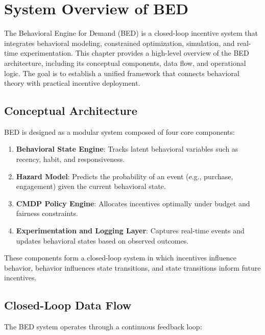 \chapter{System Overview of BED}

The Behavioral Engine for Demand (BED) is a closed-loop incentive system that
integrates behavioral modeling, constrained optimization, simulation, and
real-time experimentation. This chapter provides a high-level overview of the
BED architecture, including its conceptual components, data flow, and
operational logic. The goal is to establish a unified framework that connects
behavioral theory with practical incentive deployment.

\section{Conceptual Architecture}

BED is designed as a modular system composed of four core components:

\begin{enumerate}
    \item \textbf{Behavioral State Engine}: Tracks latent behavioral variables
    such as recency, habit, and responsiveness.
    \item \textbf{Hazard Model}: Predicts the probability of an event (e.g.,
    purchase, engagement) given the current behavioral state.
    \item \textbf{CMDP Policy Engine}: Allocates incentives optimally under
    budget and fairness constraints.
    \item \textbf{Experimentation and Logging Layer}: Captures real-time events
    and updates behavioral states based on observed outcomes.
\end{enumerate}

These components form a closed-loop system in which incentives influence
behavior, behavior influences state transitions, and state transitions inform
future incentives.

\section{Closed-Loop Data Flow}

The BED system operates through a continuous feedback loop:

